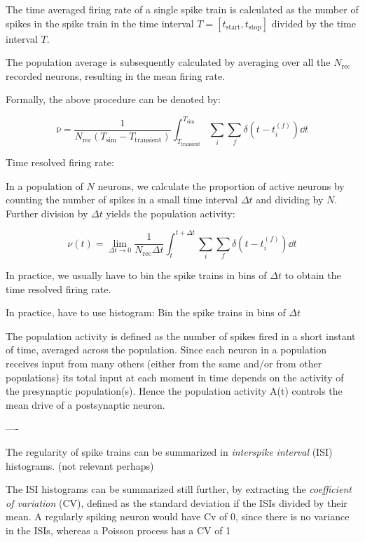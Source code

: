 The time averaged firing rate of a single spike train is calculated as the number of spikes in the spike train in the time interval $T = [t_\mathrm{start}, t_\mathrm{stop}]$ divided by the time interval $T$. 

The population average is subsequently calculated by averaging over all the $N_\mathrm{rec}$ recorded neurons, resulting in the mean firing rate.  

Formally, the above procedure can be denoted by: 

\begin{equation}
    \bar{\nu} = \frac{1}{N_\mathrm{rec} \left(T_\mathrm{sim} - T_\mathrm{transient}\right)} \int_{T_\mathrm{transient}}^{T_\mathrm{sim}} \sum_i \sum_f \delta \left(t - t_i^{(f)} \right) \dd{t}
\end{equation}

Time resolved firing rate: 

In a population of $N$ neurons, we calculate the proportion of active neurons by counting the number of spikes in a small time interval $\Delta t$ and dividing by $N$. Further division by $\Delta t$ yields the population activity:

\begin{equation}
    \nu (t) = \lim_{\Delta t \to 0} \frac{1}{N_\mathrm{rec} \Delta t} \int_{t}^{t + \Delta t} \sum_i \sum_f \delta \left(t - t_i^{(f)} \right) \dd{t}
\end{equation} 

In practice, we usually have to bin the spike trains in bins of $\Delta t$ to obtain the time resolved firing rate. 

In practice, have to use histogram: Bin the spike trains in bins of $\Delta t$


The population activity is defined as the number of spikes fired in a short instant of time, averaged across the population. Since each neuron in a population receives input from many others (either from the same and/or from other populations) its total input at each moment in time depends on the activity of the presynaptic population(s). Hence the population activity A(t) controls the mean drive of a postsynaptic neuron.





----

The regularity of spike trains can be summarized in \textit{interspike interval} (ISI) histograms. (not relevant perhaps) 

The ISI histograms can be summarized still further, by extracting the \textit{coefficient of variation} (CV), defined as the standard deviation if the ISIs divided by their mean. A regularly spiking neuron would have Cv of 0, since there is no variance in the ISIs, whereas a Poisson process has a CV of 1

